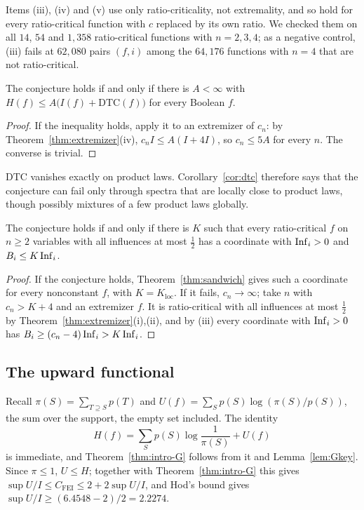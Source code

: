 Items (iii), (iv) and (v) use only ratio-criticality, not extremality, and so hold for every ratio-critical function with $c$ replaced by its own ratio. We checked them on all $14$, $54$ and $1{,}358$ ratio-critical functions with $n=2,3,4$; as a negative control, (iii) fails at $62{,}080$ pairs $(f,i)$ among the $64{,}176$ functions with $n=4$ that are not ratio-critical.

\begin{corollary}\label{cor:dtc}
The conjecture holds if and only if there is $A<\infty$ with $H(f)\le A\bigl(I(f)+\mathrm{DTC}(f)\bigr)$ for every Boolean $f$.
\end{corollary}

\begin{proof}
If the inequality holds, apply it to an extremizer of $c_n$: by Theorem~\ref{thm:extremizer}(iv), $c_nI\le A(I+4I)$, so $c_n\le5A$ for every $n$. The converse is trivial.
\end{proof}

$\mathrm{DTC}$ vanishes exactly on product laws. Corollary~\ref{cor:dtc} therefore says that the conjecture can fail only through spectra that are locally close to product laws, though possibly mixtures of a few product laws globally.

\begin{corollary}\label{cor:critical}
The conjecture holds if and only if there is $K$ such that every ratio-critical $f$ on $n\ge2$ variables with all influences at most $\frac12$ has a coordinate with $\operatorname{Inf}_i>0$ and $B_i\le K\operatorname{Inf}_i$.
\end{corollary}

\begin{proof}
If the conjecture holds, Theorem~\ref{thm:sandwich} gives such a coordinate for every nonconstant $f$, with $K=K_{\mathrm{loc}}$. If it fails, $c_n\to\infty$; take $n$ with $c_n>K+4$ and an extremizer $f$. It is ratio-critical with all influences at most $\frac12$ by Theorem~\ref{thm:extremizer}(i),(ii), and by (iii) every coordinate with $\operatorname{Inf}_i>0$ has $B_i\ge(c_n-4)\operatorname{Inf}_i>K\operatorname{Inf}_i$.
\end{proof}

\subsection{The upward functional}
Recall $\pi(S)=\sum_{T\supseteq S}p(T)$ and $U(f)=\sum_Sp(S)\log(\pi(S)/p(S))$, the sum over the support, the empty set included. The identity
\begin{equation}\label{eq:H-U}
H(f)=\sum_Sp(S)\log\frac1{\pi(S)}+U(f)
\end{equation}
is immediate, and Theorem~\ref{thm:intro-G} follows from it and Lemma~\ref{lem:Gkey}. Since $\pi\le1$, $U\le H$; together with Theorem~\ref{thm:intro-G} this gives $\sup U/I\le C_{\mathrm{FEI}}\le2+2\sup U/I$, and Hod's bound gives $\sup U/I\ge(6.4548-2)/2=2.2274$.

